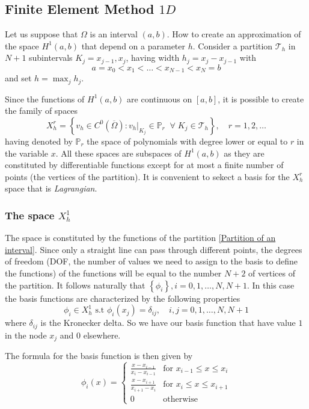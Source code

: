 \subsection{Finite Element Method \(1D\)}
Let us suppose that \(\Omega\) is an interval \((a,b)\). How to create an approximation of the space \(H^1(a,b)\) that depend on a parameter \(h\). Consider a partition \(\mathcal{T}_h\) in \(N+1\) subintervals \(K_j = x_{j-1}, x_j\), having width \(h_j = x_j - x_{j-1}\) with 
\begin{equation}
    a = x_0 < x_1 < \ldots < x_{N-1} < x_N = b \label{Partition of an interval}
\end{equation}
and set \(h = \max_j h_j\). 

Since the functions of \(H^1(a,b)\) are continuous on \([a,b]\), it is possible to create the family of spaces 
\begin{equation}
    X_h^r = \left\{v_h \in C^0\left(\overline{\Omega}\right) : v_h \vert_{K_j} \in \mathbb{P}_r \;\; \forall \; K_j \in \mathcal{T}_h\right\}, \quad r= 1,2,\ldots \label{Family of spaces FEM}
\end{equation}
having denoted by \(\mathbb{P}_r\) the space of polynomials with degree lower or equal to \(r\) in the variable \(x\). All these spaces are subspaces of \(H^1(a,b)\) as they are constituted by differentiable functions except for at most a finite number of points (the vertices of the partition). It is convenient to sekect a basis for the \(X^r_h\) space that is \textit{Lagrangian}.
\subsubsection*{The space \(X^1_h\)}
The space is constituted by the functions of the partition \eqref{Partition of an interval}. Since only a straight line can pass through different points, the degrees of freedom (DOF, the number of values we need to assign to the basis to define the functions)  of the functions will be equal to the number \(N+2\) of vertices of the partition. It follows naturally that \(\left\lbrace\phi_i\right\rbrace, i = 0, 1, \ldots, N, N+1\).
In this case the basis functions are characterized by the following properties 
\[
    \phi_i \in X^1_h \text{ s.t } \phi_i(x_j) = \delta_{ij}, \quad i, j = 0, 1, \ldots, N, N+1
\]
where \(\delta_{ij}\) is the Kronecker delta. So we have our basis function that have value \(1\) in the node \(x_j\) and \(0\) elsewhere.

The formula for the basis function is then given by 
\begin{equation}
    \phi_i(x) = \begin{cases}
        \frac{x-x_{i-1}}{x_i - x_{i-1}} & \text{for }x_{i-1} \leq x \leq x_i \\
        \frac{x-x_{i+1}}{x_{i+1} - x_i} & \text{for }x_i \leq x \leq x_{i+1} \\
        0 & \text{otherwise}
    \end{cases}
\end{equation}
